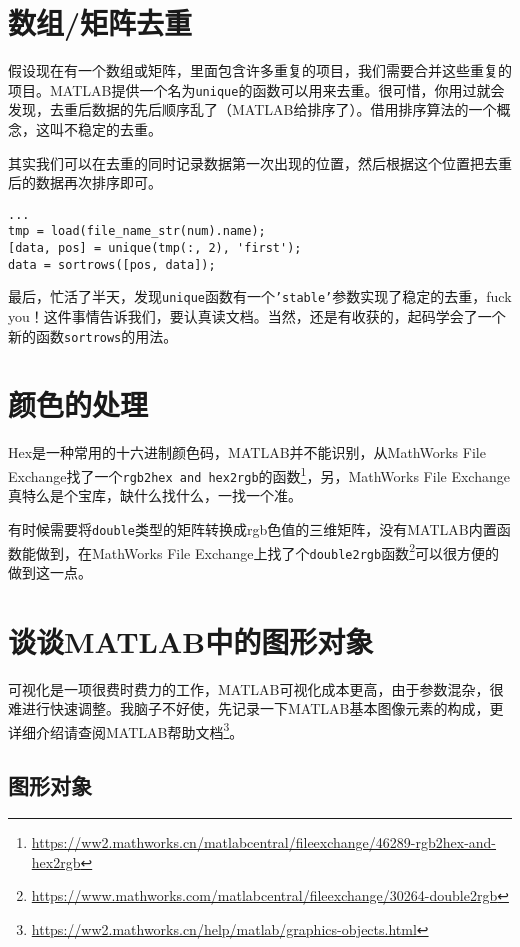 \section{数组/矩阵去重}

假设现在有一个数组或矩阵，里面包含许多重复的项目，我们需要合并这些重复的项目。MATLAB提供一个名为\texttt{unique}的函数可以用来去重。很可惜，你用过就会发现，去重后数据的先后顺序乱了（MATLAB给排序了）。借用排序算法的一个概念，这叫不稳定的去重。

其实我们可以在去重的同时记录数据第一次出现的位置，然后根据这个位置把去重后的数据再次排序即可。

\begin{verbatim}
...
tmp = load(file_name_str(num).name);
[data, pos] = unique(tmp(:, 2), 'first');
data = sortrows([pos, data]);
\end{verbatim}

最后，忙活了半天，发现\texttt{unique}函数有一个\texttt{'stable'}参数实现了稳定的去重，fuck you！这件事情告诉我们，要认真读文档。当然，还是有收获的，起码学会了一个新的函数\texttt{sortrows}的用法。


\section{颜色的处理}

Hex是一种常用的十六进制颜色码，MATLAB并不能识别，从MathWorks File Exchange找了一个\texttt{rgb2hex and hex2rgb}的函数\footnote{\url{https://ww2.mathworks.cn/matlabcentral/fileexchange/46289-rgb2hex-and-hex2rgb}}，另，MathWorks File Exchange真特么是个宝库，缺什么找什么，一找一个准。

有时候需要将\texttt{double}类型的矩阵转换成rgb色值的三维矩阵，没有MATLAB内置函数能做到，在MathWorks File Exchange上找了个\texttt{double2rgb}函数\footnote{\url{https://www.mathworks.com/matlabcentral/fileexchange/30264-double2rgb}}可以很方便的做到这一点。

\section{谈谈MATLAB中的图形对象}

可视化是一项很费时费力的工作，MATLAB可视化成本更高，由于参数混杂，很难进行快速调整。我脑子不好使，先记录一下MATLAB基本图像元素的构成，更详细介绍请查阅MATLAB帮助文档\footnote{\url{https://ww2.mathworks.cn/help/matlab/graphics-objects.html}}。

\subsection{图形对象}

